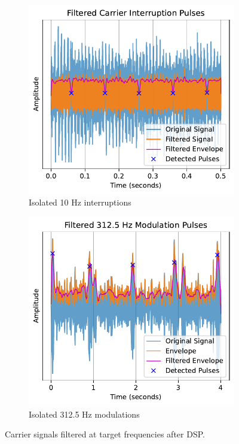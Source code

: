 \documentclass[12pt, a4paper]{extarticle}
\begin{document}
\begin{figure}[H]
  \centering
  \begin{subfigure}[b]{0.48\textwidth}
    \centering
    \includegraphics[height=0.8\textwidth]{carrier-filtered.pdf}
    \captionsetup{width=0.9\textwidth}
    \caption{Isolated 10 Hz interruptions}
    \label{fig:carrier-filtered}
  \end{subfigure}
  \hfill
  \begin{subfigure}[b]{0.48\textwidth}
    \centering
    \includegraphics[height=0.8\textwidth]{312-filtered.pdf}
    \captionsetup{width=0.9\textwidth}
    \caption{Isolated 312.5 Hz modulations}
    \label{fig:312-filtered}
  \end{subfigure}
  \captionsetup{width=0.9\textwidth}
  \caption{Carrier signals filtered at target frequencies after DSP.}
  \label{fig:dsp-results}
\end{figure}
\end{document}
